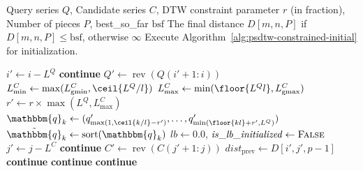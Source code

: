 \begin{algorithm*}[t] %
\scriptsize
\caption{Constrainted PSDTW with parallel computing, early abandoning and lower bounding}
\label{alg:psdtw-constrained}
\begin{algorithmic}[1]
\Require Query series $Q$, Candidate series $C$, DTW constraint parameter $r$ (in fraction), Number of pieces $P$, best\_so\_far $\mathrm{bsf}$
\Ensure The final distance $D[m, n, P]$ if $D[m, n, P] \leq \mathrm{bsf}$, otherwise $\infty$
\State Execute Algorithm~\ref{alg:psdtw-constrained-initial} for initialization.
    \color{blue}
     
    \color{black}
        {\color{black}
            \State $i' \gets i - L^Q$ 
                \State \textbf{continue}
            \EndIf
            \State $Q' \gets \operatorname{rev}(Q(i'+1: i))$ 
            \State $L_{\min}^C \gets \max(L_{\mathrm{gmin}}^C, \ceil{L^Q/l})$
            \State $L_{\max}^C \gets \min(\floor{L^Ql}, L_{\mathrm{gmax}}^C)$
            \color{green}
            \State $r' \gets r \times \max(L^Q, L_{\max}^C)$ 
                \State $\mathbbm{q}_k \gets (q'_{\max(1, \ceil{k/l} - r')}, \ldots, q'_{\min(\floor{kl} + r', L^Q)})$ 
                \State $\tilde{\mathbbm{q}}_k \gets \operatorname{sort}(\mathbbm{q}_k)$
            \EndFor
            \color{black}
                \State $\mathit{lb} \gets 0.0$, $\mathit{is\_lb\_initialized} \gets \textsc{False}$
                    \State $j' \gets j - L^C$
                        \State \textbf{continue}
                    \EndIf
                    \State $C' \gets \operatorname{rev}(C(j'+1: j))$
                    \State $\mathit{dist}_{\mathrm{prev}} \gets D[i', j', p-1]$
                    \color{black}
                        \State \textbf{continue}
                    \EndIf
                    \color{orange}
                        \State \textbf{continue}
                    \EndIf
                    \color{black}
                     
                        \State \textbf{continue}
                    \EndIf
                    \color{green}
                    
}
\end{algorithmic}
\end{algorithm*}

